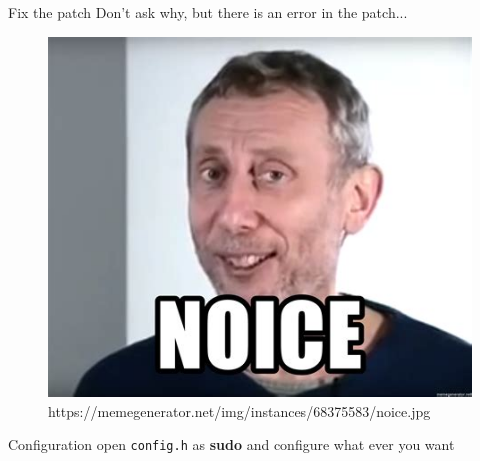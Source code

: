 \documentclass[10pt,graphics,aspectratio=169,table]{beamer}
\begin{document}
\begin{frame}{Fix the patch}
	Don't ask why, but there is an error in the patch...
	\begin{figure}
		\includegraphics[scale=0.4]{Noice.jpg}
		\caption{https://memegenerator.net/img/instances/68375583/noice.jpg}
	\end{figure}
\end{frame}



\begin{frame}{Configuration}
	open \texttt{config.h} as \textbf{sudo} and configure what ever you want
\end{frame}
	
\end{document}
